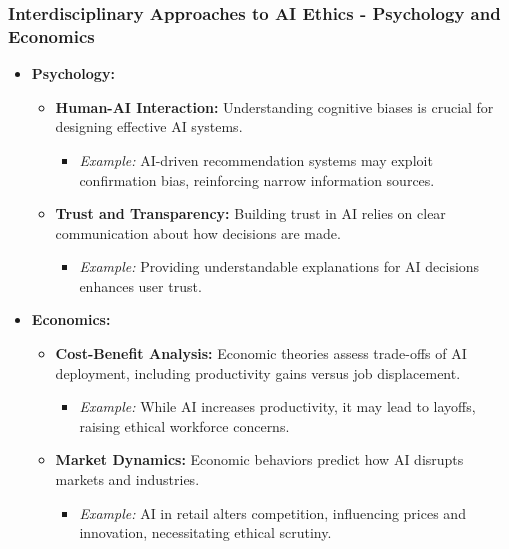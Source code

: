 \documentclass[aspectratio=169]{beamer}
\begin{document}
\begin{frame}[fragile]
  \frametitle{Interdisciplinary Approaches to AI Ethics - Psychology and Economics}
  \begin{itemize}
    \item \textbf{Psychology:}
      \begin{itemize}
        \item \textbf{Human-AI Interaction:} Understanding cognitive biases is crucial for designing effective AI systems.
          \begin{itemize}
            \item \textit{Example:} AI-driven recommendation systems may exploit confirmation bias, reinforcing narrow information sources.
          \end{itemize}
        \item \textbf{Trust and Transparency:} Building trust in AI relies on clear communication about how decisions are made.
          \begin{itemize}
            \item \textit{Example:} Providing understandable explanations for AI decisions enhances user trust.
          \end{itemize}
      \end{itemize}
    \item \textbf{Economics:}
      \begin{itemize}
        \item \textbf{Cost-Benefit Analysis:} Economic theories assess trade-offs of AI deployment, including productivity gains versus job displacement.
          \begin{itemize}
            \item \textit{Example:} While AI increases productivity, it may lead to layoffs, raising ethical workforce concerns.
          \end{itemize}
        \item \textbf{Market Dynamics:} Economic behaviors predict how AI disrupts markets and industries.
          \begin{itemize}
            \item \textit{Example:} AI in retail alters competition, influencing prices and innovation, necessitating ethical scrutiny.
          \end{itemize}
      \end{itemize}
  \end{itemize}
\end{frame}
\end{document}
